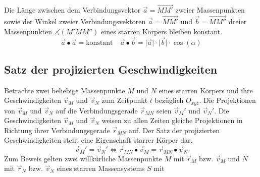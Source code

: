 Die Länge zwischen dem Verbindungsvektor $\overrightarrow{a}=\overrightarrow{MM'}$ zweier Massenpunkten sowie der Winkel zweier Verbindungsvektoren $\overrightarrow{a}=\overrightarrow{MM'}$ und $\overrightarrow{b}=\overrightarrow{MM''}$ dreier Massenpunkten $\measuredangle\left(M'MM''\right)$ eines starren Körpers bleiben konstant.
\begin{equation}  
\boxed{\overrightarrow{a}\bullet \overrightarrow{a}=\text{konstant}}\quad \boxed{\overrightarrow{a}\bullet \overrightarrow{b}=\Big\vert\overrightarrow{a}\Big\vert\cdot \Big\vert\overrightarrow{b}\Big\vert\cdot \cos\left(\alpha\right)}
\end{equation}  
\subsection{Satz der projizierten Geschwindigkeiten}
Betrachte zwei beliebige Massenpunkte $M$ und $N$ eines starren Körpers und ihre Geschwindigkeiten $\overrightarrow{v}_M$ und $\overrightarrow{v}_N$ zum Zeitpunkt $t$ bezüglich $O_{xyz}$. Die Projektionen von $\overrightarrow{v}_M$ und $\overrightarrow{v}_N$ auf die Verbindungsgerade $\overrightarrow{r}_{MN}$ seien $\overrightarrow{v}_M'$ und $\overrightarrow{v}_N'$. Die Geschwindigkeiten $\overrightarrow{v}_M$ und $\overrightarrow{v}_N$ weisen zu allen Zeiten gleiche Projektionen in Richtung ihrer Verbindungsgerade $\overrightarrow{r}_{MN}$ auf. Der Satz der projizierten Geschwindigkeiten stellt eine Eigenschaft starrer Körper dar.
\begin{equation}
\boxed{
\overrightarrow{v}_M'=\overrightarrow{v}_N'\Longleftrightarrow \overrightarrow{r}_{MN}\bullet \overrightarrow{v}_M=\overrightarrow{r}_{MN}\bullet\overrightarrow{v}_N
} 
\end{equation} 
Zum Beweis gelten zwei willkürliche Massenpunkte $M$ mit $\overrightarrow{r}_M$ bzw. $\overrightarrow{v}_M$ und $N$ mit $\overrightarrow{r}_N$ bzw. $\overrightarrow{v}_N$ eines starren Massensystems $S$ mit 
